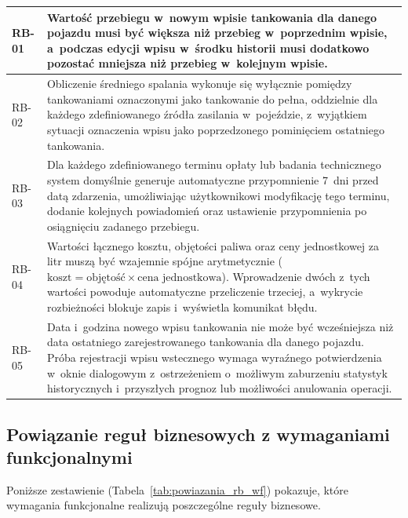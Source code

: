 \begin{longtable}{|>{\centering\arraybackslash}m{1.4cm}|m{\dimexpr\linewidth - 1.4cm - 4\tabcolsep - 3\arrayrulewidth\relax}|}
    \hypertarget{rb:RB-01}{RB-01} & Wartość przebiegu w~nowym wpisie tankowania dla danego pojazdu musi być większa niż przebieg w~poprzednim wpisie, a~podczas edycji wpisu w~środku historii musi dodatkowo pozostać mniejsza niż przebieg w~kolejnym wpisie. \\
    \hline
    \hypertarget{rb:RB-02}{RB-02} & Obliczenie średniego spalania wykonuje się wyłącznie pomiędzy tankowaniami oznaczonymi jako tankowanie do pełna, oddzielnie dla każdego zdefiniowanego źródła zasilania w~pojeździe, z~wyjątkiem sytuacji oznaczenia wpisu jako poprzedzonego pominięciem ostatniego tankowania. \\
    \hline
    \hypertarget{rb:RB-03}{RB-03} & Dla każdego zdefiniowanego terminu opłaty lub badania technicznego system domyślnie generuje automatyczne przypomnienie 7~dni przed datą zdarzenia, umożliwiając użytkownikowi modyfikację tego terminu, dodanie kolejnych powiadomień oraz ustawienie przypomnienia po osiągnięciu zadanego przebiegu. \\
    \hline
    \hypertarget{rb:RB-04}{RB-04} & Wartości łącznego kosztu, objętości paliwa oraz ceny jednostkowej za litr muszą być wzajemnie spójne arytmetycznie ($\text{koszt} = \text{objętość} \times \text{cena jednostkowa}$). Wprowadzenie dwóch z~tych wartości powoduje automatyczne przeliczenie trzeciej, a~wykrycie rozbieżności blokuje zapis i~wyświetla komunikat błędu. \\
    \hline
    \hypertarget{rb:RB-05}{RB-05} & Data i~godzina nowego wpisu tankowania nie może być wcześniejsza niż data ostatniego zarejestrowanego tankowania dla danego pojazdu. Próba rejestracji wpisu wstecznego wymaga wyraźnego potwierdzenia w~oknie dialogowym z~ostrzeżeniem o~możliwym zaburzeniu statystyk historycznych i~przyszłych prognoz lub możliwości anulowania operacji. \\
    \hline
\end{longtable}
\endgroup

\clearpage

\subsection{Powiązanie reguł biznesowych z wymaganiami funkcjonalnymi}
\label{subsec:powiazanie_rb_wf}

Poniższe zestawienie (Tabela~\ref{tab:powiazania_rb_wf}) pokazuje, które wymagania funkcjonalne realizują poszczególne reguły biznesowe.

